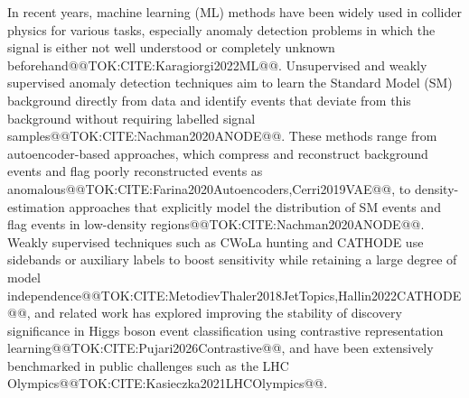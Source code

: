 \documentclass[11pt]{article}
\begin{document}
In recent years, machine learning (ML) methods have been widely used in collider physics for various tasks, especially anomaly detection problems in which the signal is either not well understood or completely unknown beforehand@@TOK:CITE:Karagiorgi2022ML@@. Unsupervised and weakly supervised anomaly detection techniques aim to learn the Standard Model (SM) background directly from data and identify events that deviate from this background without requiring labelled signal samples@@TOK:CITE:Nachman2020ANODE@@. These methods range from autoencoder-based approaches, which compress and reconstruct background events and flag poorly reconstructed events as anomalous@@TOK:CITE:Farina2020Autoencoders,Cerri2019VAE@@, to density-estimation approaches that explicitly model the distribution of SM events and flag events in low-density regions@@TOK:CITE:Nachman2020ANODE@@. Weakly supervised techniques such as CWoLa hunting and CATHODE use sidebands or auxiliary labels to boost sensitivity while retaining a large degree of model independence@@TOK:CITE:MetodievThaler2018JetTopics,Hallin2022CATHODE@@, and related work has explored improving the stability of discovery significance in Higgs boson event classification using contrastive representation learning@@TOK:CITE:Pujari2026Contrastive@@, and have been extensively benchmarked in public challenges such as the LHC Olympics@@TOK:CITE:Kasieczka2021LHCOlympics@@.
\end{document}

